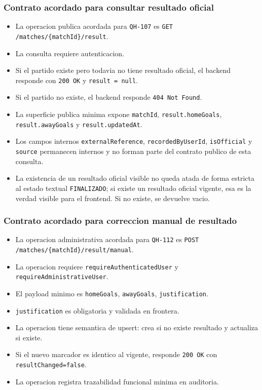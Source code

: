 \subsubsection{Contrato acordado para consultar resultado oficial}

\begin{itemize}
  \item La operacion publica acordada para \texttt{QH-107} es \texttt{GET /matches/\{matchId\}/result}.
  \item La consulta requiere autenticacion.
  \item Si el partido existe pero todavia no tiene resultado oficial, el backend responde con \texttt{200 OK} y \texttt{result = null}.
  \item Si el partido no existe, el backend responde \texttt{404 Not Found}.
  \item La superficie publica minima expone \texttt{matchId}, \texttt{result.homeGoals}, \texttt{result.awayGoals} y \texttt{result.updatedAt}.
  \item Los campos internos \texttt{externalReference}, \texttt{recordedByUserId}, \texttt{isOfficial} y \texttt{source} permanecen internos y no forman parte del contrato publico de esta consulta.
  \item La existencia de un resultado oficial visible no queda atada de forma estricta al estado textual \texttt{FINALIZADO}; si existe un resultado oficial vigente, esa es la verdad visible para el frontend. Si no existe, se devuelve vacio.
\end{itemize}

\subsubsection{Contrato acordado para correccion manual de resultado}

\begin{itemize}
  \item La operacion administrativa acordada para \texttt{QH-112} es \texttt{POST /matches/\{matchId\}/result/manual}.
  \item La operacion requiere \texttt{requireAuthenticatedUser} y \texttt{requireAdministrativeUser}.
  \item El payload minimo es \texttt{homeGoals}, \texttt{awayGoals}, \texttt{justification}.
  \item \texttt{justification} es obligatoria y validada en frontera.
  \item La operacion tiene semantica de upsert: crea si no existe resultado y actualiza si existe.
  \item Si el nuevo marcador es identico al vigente, responde \texttt{200 OK} con \texttt{resultChanged=false}.
  \item La operacion registra trazabilidad funcional minima en auditoria.
\end{itemize}

